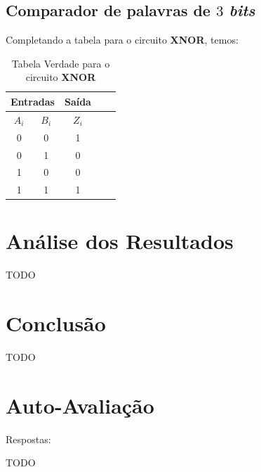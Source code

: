 \documentclass[12pt]{article}
\begin{document}
\subsection{Comparador de palavras de \(3\) \emph{bits}}\label{sec:comparador_de_palavras_3_bits}

Completando a tabela para o circuito \textbf{XNOR}, temos:

\begin{table}[H]
    \centering
    \caption{Tabela Verdade para o circuito \textbf{XNOR}}
    \begin{tabular}{|c|c|c|c|c|}\hline
    \multicolumn{2}{|c|}{Entradas} & \multicolumn{1}{|c|}{Saída} \\\hline
    \textbf{$A_{i}$} & \textbf{$B_{i}$} & \textbf{$Z_{i}$} \\\hline
    0 & 0 & 1 \\\hline
    0 & 1 & 0 \\\hline
    1 & 0 & 0 \\\hline
    1 & 1 & 1 \\\hline
    \end{tabular}\label{tab:comparador_de_palavras_3_bits}
\end{table}


\section{Análise dos Resultados}
\label{sec:Resultados}

TODO

\section{Conclusão}
\label{sec:Conclusao}

TODO

\nocite{*}



\newpage
\section*{Auto-Avaliação}

Respostas:

TODO
\end{document}
